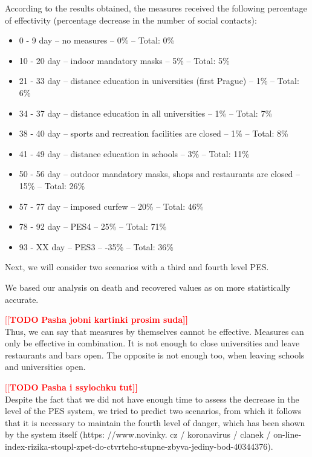\documentclass[12pt,a4paper,english]{article}
\newcommand{\todo}[1]{\noindent\textcolor{red}{[[\textbf{TODO} \textbf{#1]]}}\\}
\begin{document}
    According to the results obtained, the measures received the following percentage of effectivity (percentage decrease in the number of social contacts):
    \begin{itemize}
        \item 0 - 9   day -- no measures -- 0\% -- Total: 0\% 
        \item 10 - 20 day -- indoor mandatory  masks -- 5\% -- Total: 5\% 
        \item 21 - 33 day -- distance education in universities (first Prague) -- 1\% -- Total: 6\%
        \item 34 - 37 day -- distance education in all universities -- 1\% -- Total: 7\%
        \item 38 - 40 day -- sports and recreation facilities are closed -- 1\% -- Total: 8\%
        \item 41 - 49 day -- distance education in schools -- 3\% -- Total: 11\%
        \item 50 - 56 day -- outdoor mandatory masks, shops and restaurants are closed -- 15\% -- Total: 26\%
        \item 57 - 77 day -- imposed curfew -- 20\% -- Total: 46\%
        \item 78 - 92 day -- PES4 -- 25\% -- Total: 71\%
        \item 93 - XX day -- PES3 -- -35\% -- Total: 36\%
    \end{itemize}
    

    Next, we will consider two scenarios with a third and fourth level PES.
    
    We based our analysis on death and recovered values as on more statistically accurate.

    \todo{Pasha jobni kartinki prosim suda}
    
    Thus, we can say that measures by themselves cannot be effective. Measures can only be effective in combination. It is not enough to close universities and leave restaurants and bars open. The opposite is not enough too, when leaving schools and universities open.
    
     \todo{Pasha i ssylochku tut}
     
    Despite the fact that we did not have enough time to assess the decrease in the level of the PES system, we tried to predict two scenarios, from which it follows that it is necessary to maintain the fourth level of danger, which has been shown by the system itself (https: //www.novinky. cz / koronavirus / clanek / on-line-index-rizika-stoupl-zpet-do-ctvrteho-stupne-zbyva-jediny-bod-40344376).
    
\end{document}
